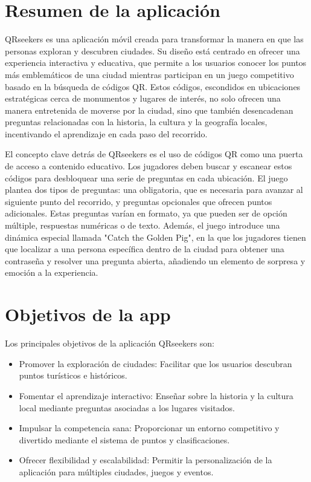 \documentclass[letterpaper, 12pt]{report}
\begin{document}
\newpage

\section{Resumen de la aplicación}

QRseekers es una aplicación móvil creada para transformar la manera en que las personas exploran y descubren ciudades. Su diseño está centrado en ofrecer una experiencia interactiva y educativa, que permite a los usuarios conocer los puntos más emblemáticos de una ciudad mientras participan en un juego competitivo basado en la búsqueda de códigos QR. Estos códigos, escondidos en ubicaciones estratégicas cerca de monumentos y lugares de interés, no solo ofrecen una manera entretenida de moverse por la ciudad, sino que también desencadenan preguntas relacionadas con la historia, la cultura y la geografía locales, incentivando el aprendizaje en cada paso del recorrido.

El concepto clave detrás de QRseekers es el uso de códigos QR como una puerta de acceso a contenido educativo. Los jugadores deben buscar y escanear estos códigos para desbloquear una serie de preguntas en cada ubicación. El juego plantea dos tipos de preguntas: una obligatoria, que es necesaria para avanzar al siguiente punto del recorrido, y preguntas opcionales que ofrecen puntos adicionales. Estas preguntas varían en formato, ya que pueden ser de opción múltiple, respuestas numéricas o de texto. Además, el juego introduce una dinámica especial llamada "Catch the Golden Pig", en la que los jugadores tienen que localizar a una persona específica dentro de la ciudad para obtener una contraseña y resolver una pregunta abierta, añadiendo un elemento de sorpresa y emoción a la experiencia.

\newpage

\section{Objetivos de la app}
Los principales objetivos de la aplicación QRseekers son:
\begin{itemize}
    \item Promover la exploración de ciudades: Facilitar que los usuarios descubran puntos turísticos e históricos.
    \item Fomentar el aprendizaje interactivo: Enseñar sobre la historia y la cultura local mediante preguntas asociadas a los lugares visitados.
    \item Impulsar la competencia sana: Proporcionar un entorno competitivo y divertido mediante el sistema de puntos y clasificaciones.
    \item Ofrecer flexibilidad y escalabilidad: Permitir la personalización de la aplicación para múltiples ciudades, juegos y eventos.
\end{itemize}
\end{document}
